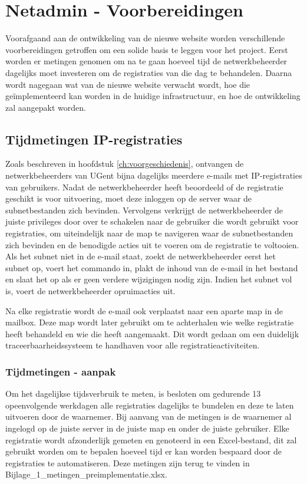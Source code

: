 
\chapter{Netadmin - Voorbereidingen}%
\label{ch:netadmin-voorbereidingen}

Voorafgaand aan de ontwikkeling van de nieuwe website worden verschillende voorbereidingen getroffen om een solide basis te leggen voor het project. Eerst worden er metingen genomen om na te gaan hoeveel tijd de netwerkbeheerder dagelijks moet investeren om de registraties van die dag te behandelen. Daarna wordt nagegaan wat van de nieuwe website verwacht wordt, hoe die geïmplementeerd kan worden in de huidige infrastructuur, en hoe de ontwikkeling zal aangepakt worden.

\section{Tijdmetingen IP-registraties}
Zoals beschreven in hoofdstuk \ref{ch:voorgeschiedenis}, ontvangen de netwerkbeheerders van UGent bijna dagelijks meerdere e-mails met IP-registraties van gebruikers. Nadat de netwerkbeheerder heeft beoordeeld of de registratie geschikt is voor uitvoering, moet deze inloggen op de server waar de subnetbestanden zich bevinden. Vervolgens verkrijgt de netwerkbeheerder de juiste privileges door over te schakelen naar de gebruiker die wordt gebruikt voor registraties, om uiteindelijk naar de map te navigeren waar de subnetbestanden zich bevinden en de benodigde acties uit te voeren om de registratie te voltooien. Als het subnet niet in de e-mail staat, zoekt de netwerkbeheerder eerst het subnet op, voert het commando in, plakt de inhoud van de e-mail in het bestand en slaat het op als er geen verdere wijzigingen nodig zijn. Indien het subnet vol is, voert de netwerkbeheerder opruimacties uit.

Na elke registratie wordt de e-mail ook verplaatst naar een aparte map in de mailbox. Deze map wordt later gebruikt om te achterhalen wie welke registratie heeft behandeld en wie die heeft aangemaakt. Dit wordt gedaan om een duidelijk traceerbaarheidssysteem te handhaven voor alle registratieactiviteiten.

\subsection{Tijdmetingen - aanpak}
Om het dagelijkse tijdsverbruik te meten, is besloten om gedurende 13 opeenvolgende werkdagen alle registraties dagelijks te bundelen en deze te laten uitvoeren door de waarnemer. Bij aanvang van de metingen is de waarnemer al ingelogd op de juiste server in de juiste map en onder de juiste gebruiker. Elke registratie wordt afzonderlijk gemeten en genoteerd in een Excel-bestand, dit zal gebruikt worden om te bepalen hoeveel tijd er kan worden bespaard door de registraties te automatiseren. Deze metingen zijn terug te vinden in Bijlage\_1\_metingen\_preimplementatie.xlsx.

